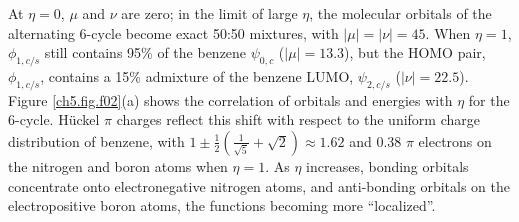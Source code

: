 At $\eta= 0$, $\mu$ and $\nu$ are zero; in the limit of large $\eta$, the molecular orbitals of the alternating 6-cycle
become exact 50:50 mixtures, with $|\mu| = |\nu| = 45$\degrees. When $\eta=1$, $\phi_{1,c/s}$ still contains 95\% of the
benzene $\psi_{0,c}$  ($|\mu | = 13.3$\degrees), but the HOMO pair, $\phi_{1,c/s}$, contains a 15\% admixture of the
benzene LUMO,  $\psi_{2,c/s}$  ($|\nu| = 22.5$\degrees).  Figure \ref{ch5.fig.f02}(a) shows the correlation of orbitals and
energies with $\eta$ for the 6-cycle. H\"uckel $\pi$ charges reflect this shift with respect to the uniform charge distribution
of benzene, with \mbox{$1 \pm \frac{1}{2} (\frac{1}{\sqrt{5}} + \sqrt{2}) \approx 1.62$} and 0.38 $\pi$ electrons on the nitrogen and
boron atoms when $\eta=1$.  As $\eta$ increases, bonding orbitals concentrate onto electronegative nitrogen atoms, and
anti-bonding orbitals on the electropositive boron atoms, the functions becoming more ``localized''. 
